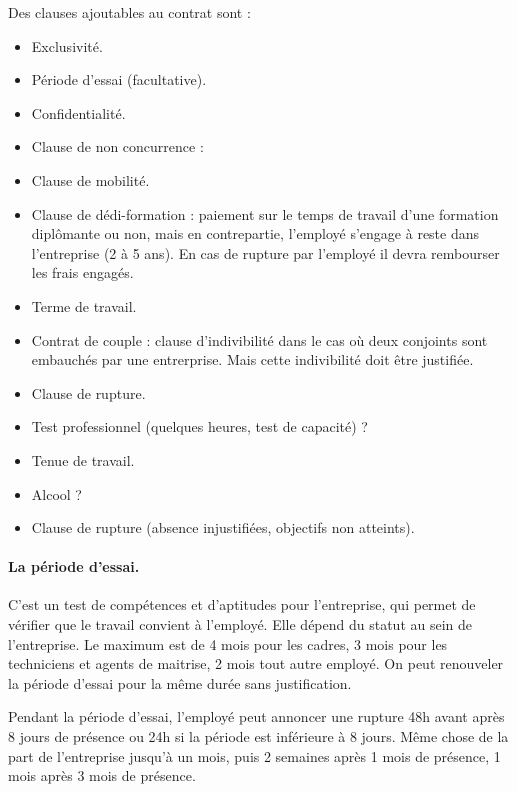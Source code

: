 	Des clauses ajoutables au contrat sont :
	\begin{itemize}
		\item[\textbullet] Exclusivité.
		\item[\textbullet] Période d’essai (facultative).
		\item[\textbullet] Confidentialité.
		\item[\textbullet] Clause de non concurrence : 
		\item[\textbullet] Clause de mobilité.
		\item[\textbullet] Clause de dédi-formation : paiement sur le temps de travail d’une formation diplômante ou non, mais en contrepartie, l’employé s’engage à reste dans l’entreprise (2 à 5 ans). En cas de rupture par l'employé il devra rembourser les frais engagés.
		\item[\textbullet] Terme de travail.
		\item[\textbullet] Contrat de couple : clause d'indivibilité dans le cas où deux conjoints sont embauchés par une entrerprise. Mais cette indivibilité doit être justifiée.
		\item[\textbullet] Clause de rupture.
		\item[\textbullet] Test professionnel (quelques heures, test de capacité) ?
		\item[\textbullet] Tenue de travail.
		\item[\textbullet] Alcool ?
		\item[\textbullet] Clause de rupture (absence injustifiées, objectifs non atteints).
	\end{itemize}
	
	\paragraph{La période d'essai.}
	C'est un test de compétences et d'aptitudes pour l'entreprise, qui permet de vérifier que le travail convient à l'employé.
	Elle dépend du statut au sein de l’entreprise. 
	Le maximum est de 4 mois pour les cadres, 3 mois pour les techniciens et agents de maitrise, 2 mois tout autre employé.
	On peut renouveler la période d’essai pour la même durée sans justification.
	
	Pendant la période d’essai, l’employé peut annoncer une rupture 48h avant après 8 jours de présence ou 24h si la période est inférieure à 8 jours.
	Même chose de la part de l'entreprise jusqu'à un mois, puis 2 semaines après 1 mois de présence, 1 mois après 3 mois de présence.
	
